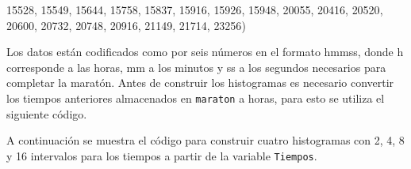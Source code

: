 \documentclass[10pt,]{krantz}
\makeatletter
\newenvironment{Shaded}{\begin{snugshade}}{\end{snugshade}}
\newcommand{\DecValTok}[1]{\textcolor[rgb]{0.00,0.00,0.81}{#1}}
\newcommand{\StringTok}[1]{\textcolor[rgb]{0.31,0.60,0.02}{#1}}
\newcommand{\OperatorTok}[1]{\textcolor[rgb]{0.81,0.36,0.00}{\textbf{#1}}}
\newcommand{\NormalTok}[1]{#1}
\newenvironment{kframe}{%
\medskip{}
\setlength{\fboxsep}{.8em}
 \def\at@end@of@kframe{}%
 \ifinner\ifhmode%
  \def\at@end@of@kframe{\end{minipage}}%
  \begin{minipage}{\columnwidth}%
 \fi\fi%
 \def\FrameCommand##1{\hskip\@totalleftmargin \hskip-\fboxsep
 \colorbox{shadecolor}{##1}\hskip-\fboxsep
     \hskip-\linewidth \hskip-\@totalleftmargin \hskip\columnwidth}%
 \MakeFramed {\advance\hsize-\width
   \@totalleftmargin\z@ \linewidth\hsize
   \@setminipage}}%
 {\par\unskip\endMakeFramed%
 \at@end@of@kframe}
\renewenvironment{Shaded}{\begin{kframe}}{\end{kframe}}
\makeatother
\begin{document}
\begin{Shaded}
\begin{Highlighting}[]
\DecValTok{15528}\NormalTok{, }\DecValTok{15549}\NormalTok{, }\DecValTok{15644}\NormalTok{, }\DecValTok{15758}\NormalTok{, }\DecValTok{15837}\NormalTok{, }\DecValTok{15916}\NormalTok{, }\DecValTok{15926}\NormalTok{, }\DecValTok{15948}\NormalTok{, }\DecValTok{20055}\NormalTok{, }
\DecValTok{20416}\NormalTok{, }\DecValTok{20520}\NormalTok{, }\DecValTok{20600}\NormalTok{, }\DecValTok{20732}\NormalTok{, }\DecValTok{20748}\NormalTok{, }\DecValTok{20916}\NormalTok{, }\DecValTok{21149}\NormalTok{, }\DecValTok{21714}\NormalTok{, }\DecValTok{23256}\NormalTok{)}
\end{Highlighting}
\end{Shaded}

Los datos están codificados como por seis números en el formato hmmss,
donde h corresponde a las horas, mm a los minutos y ss a los segundos
necesarios para completar la maratón. Antes de construir los histogramas
es necesario convertir los tiempos anteriores almacenados en
\texttt{maraton} a horas, para esto se utiliza el siguiente código.

\begin{Shaded}
\end{Shaded}

A continuación se muestra el código para construir cuatro histogramas
con 2, 4, 8 y 16 intervalos para los tiempos a partir de la variable
\texttt{Tiempos}.
\end{document}

